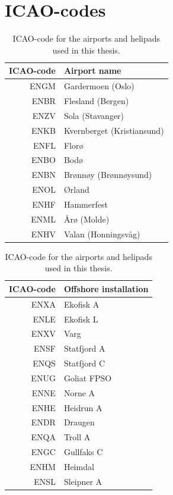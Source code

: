 \section{ICAO-codes}

\begin{table}
    \begin{subtable}[h]{0.45\textwidth}
        \centering
         \begin{tabular}{r|l}
            ICAO-code & Airport name \\
            \hline
            ENGM & Gardermoen (Oslo) \\
            ENBR & Flesland (Bergen) \\
            ENZV & Sola (Stavanger)  \\
            ENKB & Kvernberget (Kristiansund) \\
            ENFL & Florø \\
            ENBO & Bodø \\
            ENBN & Brønnøy (Brønnøysund) \\
            ENOL & Ørland \\
            ENHF & Hammerfest \\
            ENML & Årø (Molde)\\
            ENHV & Valan (Honningsvåg)\\
        \end{tabular}
    \end{subtable}
    \hfill
    \begin{subtable}[h]{0.45\textwidth}
        \centering
        \begin{tabular}{r|l}
            ICAO-code & Offshore installation\\
            \hline
            ENXA &  Ekofisk A\\
            ENLE &  Ekofisk L\\
            ENXV &  Varg\\
            ENSF &  Statfjord A\\
            ENQS &  Statfjord C\\
            ENUG &  Goliat FPSO\\
            ENNE &  Norne A\\
            ENHE &  Heidrun A\\
            ENDR &  Draugen\\
            ENQA &  Troll A\\
            ENGC &  Gullfaks C\\
            ENHM &  Heimdal\\
            ENSL &  Sleipner A\\
        \end{tabular}
     \end{subtable}
    \caption{ICAO-code for the airports and helipads used in this thesis.}
    \label{tab:ICAO-table}
\end{table}